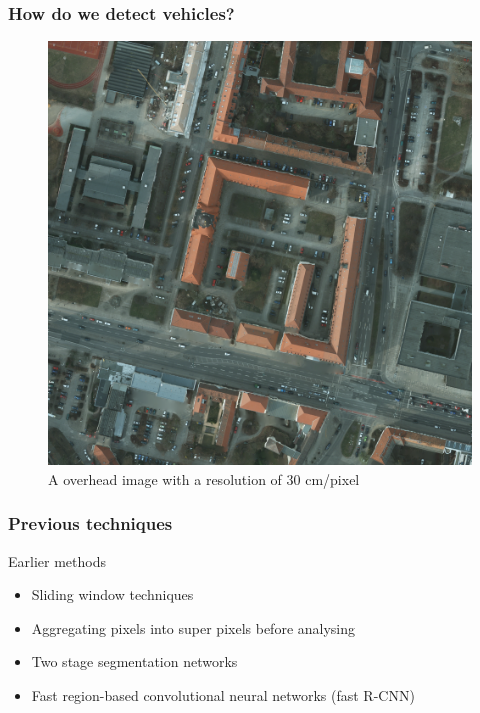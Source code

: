 \documentclass[aspectratio=1610]{beamer}
\begin{document}
\begin{frame}
  \frametitle{\hfill How do we detect vehicles?}
\begin{figure}[H]
  \includegraphics[scale=0.15]{input}
\caption{A overhead image with a resolution of 30 cm/pixel}
\end{figure}
\end{frame}


\begin{frame}
  \frametitle{\hfill Previous techniques}

  \begin{block}{Earlier methods}
    \begin{itemize}
    \item Sliding window techniques
    \item Aggregating pixels into super pixels before analysing
    \item Two stage segmentation networks
    \item Fast region-based convolutional neural networks (fast R-CNN)
    \end{itemize}
  \end{block}

\end{frame}
\end{document}
